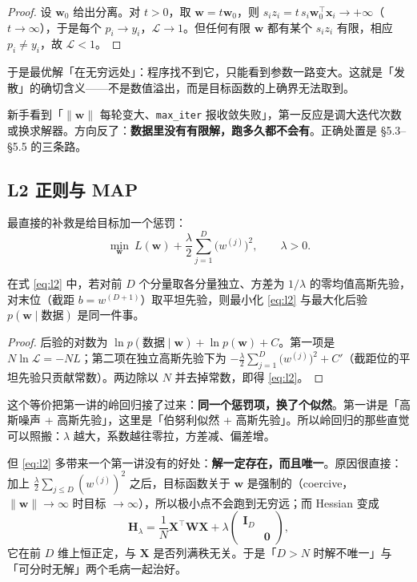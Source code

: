 \documentclass[11pt,a4paper,fontset=windows,zihao=-4]{ctexart}
\newcommand{\bX}{\mathbf{X}}
\newcommand{\bw}{\mathbf{w}}
\newcommand{\bx}{\mathbf{x}}
\newcommand{\bI}{\mathbf{I}}
\newcommand{\bH}{\mathbf{H}}
\newcommand{\bW}{\mathbf{W}}
\newcommand{\tp}{^{\top}}
\newcommand{\norm}[1]{\lVert #1\rVert}
\begin{document}
\begin{proof}
设 $\bw_0$ 给出分离。对 $t>0$，取 $\bw=t\bw_0$，则 $s_iz_i=t\,s_i\bw_0\tp\bx_i\to+\infty$（$t\to\infty$），于是每个 $p_i\to y_i$，$\mathcal{L}\to1$。但任何有限 $\bw$ 都有某个 $s_iz_i$ 有限，相应 $p_i\ne y_i$，故 $\mathcal{L}<1$。
\end{proof}

于是最优解「在无穷远处」：程序找不到它，只能看到参数一路变大。这就是「发散」的确切含义——不是数值溢出，而是目标函数的上确界无法取到。

\begin{warn}
新手看到「$\norm{\bw}$ 每轮变大、\texttt{max\_iter} 报收敛失败」，第一反应是调大迭代次数或换求解器。方向反了：\textbf{数据里没有有限解，跑多久都不会有}。正确处置是 \S5.3--\S5.5 的三条路。
\end{warn}

\subsection{L2 正则与 MAP}

最直接的补救是给目标加一个惩罚：
\begin{equation}
  \min_{\bw}\ L(\bw)+\frac{\lambda}{2}\sum_{j=1}^{D}\bigl(w^{(j)}\bigr)^{2},\qquad \lambda>0 .
  \label{eq:l2}
\end{equation}

\begin{thm}
在式 \eqref{eq:l2} 中，若对前 $D$ 个分量取各分量独立、方差为 $1/\lambda$ 的零均值高斯先验，对末位（截距 $b=w^{(D+1)}$）取平坦先验，则最小化 \eqref{eq:l2} 与最大化后验 $p(\bw\mid\text{数据})$ 是同一件事。
\end{thm}

\begin{proof}
后验的对数为 $\ln p(\text{数据}\mid\bw)+\ln p(\bw)+C$。第一项是 $N\ln\mathcal{L}=-NL$；第二项在独立高斯先验下为 $-\frac{\lambda}{2}\sum_{j=1}^{D}\bigl(w^{(j)}\bigr)^{2}+C'$（截距位的平坦先验只贡献常数）。两边除以 $N$ 并去掉常数，即得 \eqref{eq:l2}。
\end{proof}

这个等价把第一讲的岭回归接了过来：\textbf{同一个惩罚项，换了个似然}。第一讲是「高斯噪声 + 高斯先验」，这里是「伯努利似然 + 高斯先验」。所以岭回归的那些直觉可以照搬：$\lambda$ 越大，系数越往零拉，方差减、偏差增。

但 \eqref{eq:l2} 多带来一个第一讲没有的好处：\textbf{解一定存在，而且唯一}。原因很直接：加上 $\frac{\lambda}{2}\sum_{j\le D}(w^{(j)})^{2}$ 之后，目标函数关于 $\bw$ 是强制的（coercive，$\norm{\bw}\to\infty$ 时目标 $\to\infty$），所以极小点不会跑到无穷远；而 Hessian 变成
\begin{equation}
  \bH_{\lambda}=\frac1N\bX\tp\bW\bX+\lambda\begin{pmatrix}\bI_{D}&\\&\mathbf{0}\end{pmatrix},
\end{equation}
它在前 $D$ 维上恒正定，与 $\bX$ 是否列满秩无关。于是「$D>N$ 时解不唯一」与「可分时无解」两个毛病一起治好。
\end{document}
